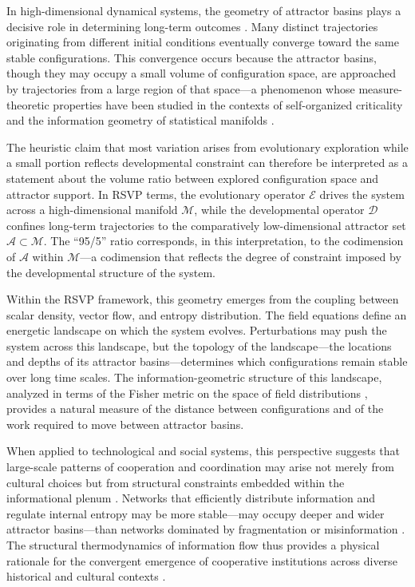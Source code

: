 \documentclass[12pt]{article}
\begin{document}
In high-dimensional dynamical systems, the geometry of attractor basins plays a decisive role in determining long-term outcomes \cite{strogatz1994,kauffman1993}. Many distinct trajectories originating from different initial conditions eventually converge toward the same stable configurations. This convergence occurs because the attractor basins, though they may occupy a small volume of configuration space, are approached by trajectories from a large region of that space---a phenomenon whose measure-theoretic properties have been studied in the contexts of self-organized criticality \cite{bak1996} and the information geometry of statistical manifolds \cite{amari2016}.

The heuristic claim that most variation arises from evolutionary exploration while a small portion reflects developmental constraint \cite{smart2009} can therefore be interpreted as a statement about the volume ratio between explored configuration space and attractor support. In RSVP terms, the evolutionary operator $\mathcal{E}$ drives the system across a high-dimensional manifold $\mathcal{M}$, while the developmental operator $\mathcal{D}$ confines long-term trajectories to the comparatively low-dimensional attractor set $\mathcal{A} \subset \mathcal{M}$. The ``95/5'' ratio corresponds, in this interpretation, to the codimension of $\mathcal{A}$ within $\mathcal{M}$---a codimension that reflects the degree of constraint imposed by the developmental structure of the system.

Within the RSVP framework, this geometry emerges from the coupling between scalar density, vector flow, and entropy distribution. The field equations define an energetic landscape on which the system evolves. Perturbations may push the system across this landscape, but the topology of the landscape---the locations and depths of its attractor basins---determines which configurations remain stable over long time scales. The information-geometric structure of this landscape, analyzed in terms of the Fisher metric on the space of field distributions \cite{amari2016}, provides a natural measure of the distance between configurations and of the work required to move between attractor basins.

When applied to technological and social systems, this perspective suggests that large-scale patterns of cooperation and coordination may arise not merely from cultural choices but from structural constraints embedded within the informational plenum \cite{smart2023,dechardin1955}. Networks that efficiently distribute information and regulate internal entropy may be more stable---may occupy deeper and wider attractor basins---than networks dominated by fragmentation or misinformation \cite{barabasi2016,bak1996}. The structural thermodynamics of information flow thus provides a physical rationale for the convergent emergence of cooperative institutions across diverse historical and cultural contexts \cite{gellmann1994,mitchell2009}.
\end{document}
